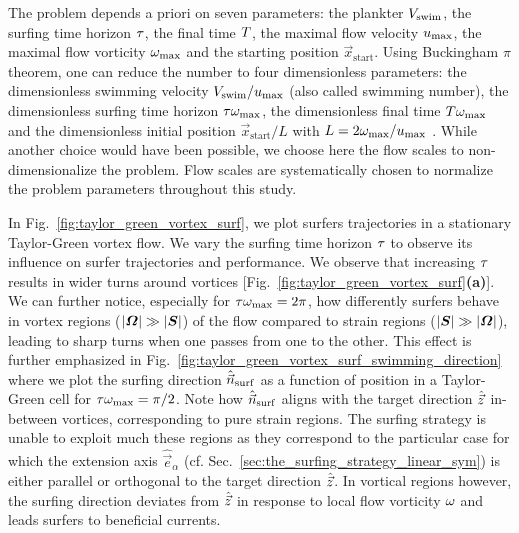 The problem depends a priori on seven parameters: the plankter $V_{\mathrm{swim}}$, the surfing time horizon $\tau$, the final time $T$, the maximal flow velocity $u_{\mathrm{max}}$, the maximal flow vorticity $\omega_{\mathrm{max}}$ and the starting position $\vec{x}_{\mathrm{start}}$.
Using Buckingham $\pi$ theorem, one can reduce the number to four dimensionless parameters: the dimensionless swimming velocity $V_{\mathrm{swim}}/u_{\mathrm{max}}$ (also called swimming number), the dimensionless surfing time horizon $\tau \omega_{\mathrm{max}}$, the dimensionless final time $T \omega_{\mathrm{max}}$ and the dimensionless initial position $\vec{x}_{\mathrm{start}} / L$ with $L = 2 \omega_{\mathrm{max}} / u_{\mathrm{max}}$ \citep{bertrand1878homogeneite, vaschy1892lois, buckingham1914physically}.
While another choice would have been possible, we choose here the flow scales to non-dimensionalize the problem.
Flow scales are systematically chosen to normalize the problem parameters throughout this study.

In Fig.~\ref{fig:taylor_green_vortex_surf}, we plot surfers trajectories in a stationary Taylor-Green vortex flow. 
We vary the surfing time horizon $\tau$ to observe its influence on surfer trajectories and performance.
We observe that increasing $\tau$ results in wider turns around vortices [Fig.~\ref{fig:taylor_green_vortex_surf}\textbf{(a)}].
We can further notice, especially for $\tau \omega_{\mathrm{max}} = 2\pi$, how differently surfers behave in vortex regions ($\lvert\boldsymbol{\varOmega}\rvert \gg \lvert\boldsymbol{S}\rvert$) of the flow compared to strain regions ($\lvert\boldsymbol{S}\rvert \gg \lvert\boldsymbol{\varOmega}\rvert$), leading to sharp turns when one passes from one to the other.
This effect is further emphasized in Fig.~\ref{fig:taylor_green_vortex_surf_swimming_direction} where we plot the surfing direction $\hat{\vec{n}}_{\mathrm{surf}}$ as a function of position in a Taylor-Green cell for $\tau \omega_{\mathrm{max}} = \pi/2$.
Note how $\hat{\vec{n}}_{\mathrm{surf}}$ aligns with the target direction $\hat{\vec{z}}$ in-between vortices, corresponding to pure strain regions.
The surfing strategy is unable to exploit much these regions as they correspond to the particular case for which the extension axis $\hat{\vec{e}}_{\alpha}$ (cf. Sec.~\ref{sec:the_surfing_strategy_linear_sym}) is either parallel or orthogonal to the target direction $\hat{\vec{z}}$.
In vortical regions however, the surfing direction deviates from $\hat{\vec{z}}$ in response to local flow vorticity $\omega$ and leads surfers to beneficial currents.

